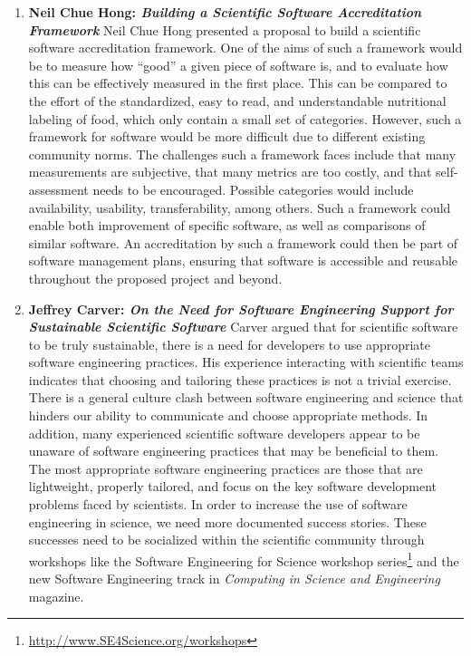 \documentclass[11pt, oneside]{amsart}
\newcommand{\choinote}[1]{ {\textcolor{orange}    {***Choi: #1 }}}
\begin{document}
\begin{enumerate}
\item \textbf{Neil Chue Hong: \textit{Building a Scientific Software
Accreditation Framework}} Neil Chue Hong presented a proposal to build a
scientific software accreditation framework. One of the aims of such a framework
would be to measure how ``good'' a given piece of software is, and to evaluate
how this can be effectively measured in the first place. This can be compared to
the effort of the standardized, easy to read, and understandable nutritional
labeling of food, which only contain a small set of categories. However, such a
framework for software would be more difficult due to different existing
community norms. The challenges such a framework faces include that many
measurements are subjective, that many metrics are too costly, and that
self-assessment needs to be encouraged. Possible categories would include
availability, usability, transferability, among others. Such a framework could
enable both improvement of specific software, as well as comparisons of similar
software. An accreditation by such a framework could then be part of software
management plans, ensuring that software is accessible and reusable throughout
the proposed project and beyond.

\item \textbf{Jeffrey Carver: \textit{On the Need for Software Engineering
Support for Sustainable Scientific Software}} Carver argued that for scientific
software to be truly sustainable, there is a need for developers to use
appropriate software engineering practices. His experience interacting with
scientific teams indicates that choosing and tailoring these practices is not a
trivial exercise. There is a general culture clash between software engineering
and science that hinders our ability to communicate and choose appropriate
methods. In addition, many experienced scientific software developers appear to
be unaware of software engineering practices that may be beneficial to them. The
most appropriate software engineering practices are those that are lightweight,
properly tailored, and focus on the key software development problems faced by
scientists. In order to increase the use of software engineering in science, we
need more documented success stories. These successes need to be socialized 
within the scientific community through workshops like the Software Engineering
for Science workshop
series\footnote{\href{http://www.SE4Science.org/workshops}{http://www.SE4Science.org/workshops}}
and the new Software Engineering track in \textit{Computing in Science and
Engineering} magazine.


\end{enumerate}
\end{document}
